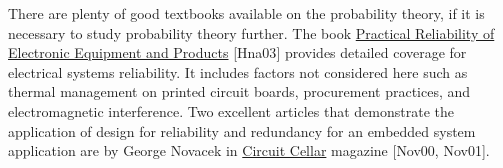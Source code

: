There are plenty of good textbooks available on the probability theory,
if it is necessary to study probability theory further. The book
\ul{Practical Reliability of Electronic Equipment and Products}
{[}Hna03{]} provides detailed coverage for electrical systems
reliability. It includes factors not considered here such as thermal
management on printed circuit boards, procurement practices, and
electromagnetic interference. Two excellent articles that demonstrate
the application of design for reliability and redundancy for an embedded
system application are by George Novacek in \ul{Circuit Cellar} magazine
{[}Nov00, Nov01{]}.
